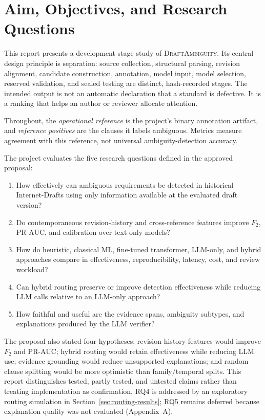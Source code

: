 \documentclass[12pt,a4paper,oneside]{report}
\newcommand{\system}{\textsc{DraftAmbiguity}}
\begin{document}
\section{Aim, Objectives, and Research Questions}

This report presents a development-stage study of \system. Its central design principle is separation: source collection, structural parsing, revision alignment, candidate construction, annotation, model input, model selection, reserved validation, and sealed testing are distinct, hash-recorded stages. The intended output is not an automatic declaration that a standard is defective. It is a ranking that helps an author or reviewer allocate attention.

Throughout, the \emph{operational reference} is the project's binary annotation artifact, and \emph{reference positives} are the clauses it labels ambiguous. Metrics measure agreement with this reference, not universal ambiguity-detection accuracy.

The project evaluates the five research questions defined in the approved proposal:

\begin{enumerate}[label=\textbf{RQ\arabic*:},leftmargin=*]
  \item How effectively can ambiguous requirements be detected in historical Internet-Drafts using only information available at the evaluated draft version?
  \item Do contemporaneous revision-history and cross-reference features improve $F_2$, PR-AUC, and calibration over text-only models?
  \item How do heuristic, classical ML, fine-tuned transformer, LLM-only, and hybrid approaches compare in effectiveness, reproducibility, latency, cost, and review workload?
  \item Can hybrid routing preserve or improve detection effectiveness while reducing LLM calls relative to an LLM-only approach?
  \item How faithful and useful are the evidence spans, ambiguity subtypes, and explanations produced by the LLM verifier?
\end{enumerate}

The proposal also stated four hypotheses: revision-history features would improve $F_2$ and PR-AUC; hybrid routing would retain effectiveness while reducing LLM use; evidence grounding would reduce unsupported explanations; and random clause splitting would be more optimistic than family/temporal splits. This report distinguishes tested, partly tested, and untested claims rather than treating implementation as confirmation. RQ4 is addressed by an exploratory routing simulation in Section~\ref{sec:routing-results}; RQ5 remains deferred because explanation quality was not evaluated (Appendix~A).
\end{document}

